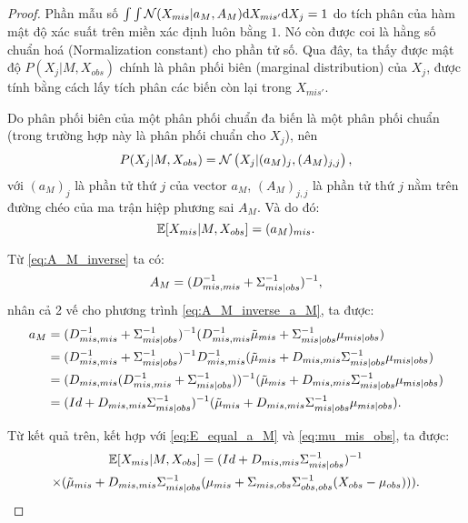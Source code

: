 \begin{proof}
    Phần mẫu số $\int \int \mathcal{N}(X_{mis} | a_M, A_M) \mathrm{d} X_{mis'} \mathrm{d} X_j = 1$ do tích phân của hàm mật độ xác suất trên miền xác định luôn bằng $1$. Nó còn được coi là hằng số chuẩn hoá (Normalization constant) cho phần tử số. Qua đây, ta thấy được mật độ $P(X_j|M, X_{obs})$ chính là phân phối biên  (marginal distribution) của $X_j$, được tính bằng cách lấy tích phân các biến còn lại trong $X_{mis'}$.

    Do phân phối biên của một phân phối chuẩn đa biến là một phân phối chuẩn (trong trường hợp này là phân phối chuẩn cho $X_j$), nên
    \[
      P(X_j|M, X_{obs}) = \mathcal{N} \left(X_j | (a_M)_j , (A_M)_{j,j}\right), 
    \]
    với $(a_M)_j$ là phần tử thứ $j$ của vector $a_M$, $(A_M)_{j,j}$ là phần tử thứ $j$ nằm trên đường chéo của ma trận hiệp phương sai $A_M$.
    Và do đó:
    \begin{equation}\label{eq:E_equal_a_M}
        \mathbb{E} [X_{mis} | M, X_{obs}] = (a_M)_{mis}.
    \end{equation}

    Từ \eqref{eq:A_M_inverse} ta có:
    \begin{equation*}
        A_M = ( D_{mis,mis}^{-1} + \Sigma_{mis|obs}^{-1} )^{-1},
    \end{equation*}
    nhân cả 2 vế cho phương trình \eqref{eq:A_M_inverse_a_M}, ta được:
    \begin{align*}
        a_M &= ( D_{mis,mis}^{-1} + \Sigma_{mis|obs}^{-1} )^{-1} 
        ( D_{mis,mis}^{-1}\tilde{\mu}_{mis} + \Sigma_{mis|obs}^{-1}\mu_{mis|obs} ) \\
        &= ( D_{mis,mis}^{-1} + \Sigma_{mis|obs}^{-1} )^{-1} 
        D_{mis,mis}^{-1} ( \tilde{\mu}_{mis} + D_{mis,mis}\Sigma_{mis|obs}^{-1}\mu_{mis|obs} ) \\
        &= ( D_{mis,mis} (D_{mis,mis}^{-1} + \Sigma_{mis|obs}^{-1}) )^{-1} 
         ( \tilde{\mu}_{mis} + D_{mis,mis}\Sigma_{mis|obs}^{-1}\mu_{mis|obs} ) \\
        &= (Id + D_{mis,mis}\Sigma_{mis|obs}^{-1} )^{-1} 
         ( \tilde{\mu}_{mis} + D_{mis,mis}\Sigma_{mis|obs}^{-1}\mu_{mis|obs} ). 
    \end{align*}

    Từ kết quả trên, kết hợp với \eqref{eq:E_equal_a_M} và \eqref{eq:mu_mis_obs}, ta được:
    \begin{multline*}
        \mathbb{E} [X_{mis} | M, X_{obs}] = (Id + D_{mis,mis}\Sigma_{mis|obs}^{-1} )^{-1} \\
         \times ( \tilde{\mu}_{mis} + D_{mis,mis}\Sigma_{mis|obs}^{-1} 
         (\mu_{mis} + \Sigma_{mis, obs}\Sigma_{obs, obs}^{-1} (X_{obs} - \mu_{obs}) )  ).
    \end{multline*}


\end{proof}

